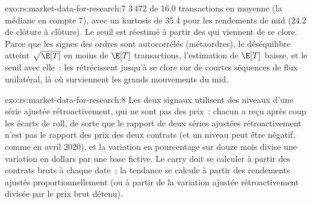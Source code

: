 \begin{solution}{exo:rs:market-data-for-research:7}
3\,472  de 16.0 transactions en moyenne (la  médiane en compte 7), avec un kurtosis de 35.4 pour les rendements de mid (24.2 de clôture à clôture).
Le seuil est réestimé à partir des  qui viennent de se clore. Parce que les signes des ordres sont autocorrélés (métaordres), le déséquilibre
atteint $\sqrt{\E[T]}$ en moins de $\E[T]$ transactions, l'estimation de $\E[T]$ baisse, et le seuil avec elle~: les 
rétrécissent jusqu'à se clore sur de courtes séquences de flux unilatéral, là où surviennent les grands mouvements du mid.
\end{solution}

\begin{solution}{exo:rs:market-data-for-research:8}
Les deux signaux utilisent des niveaux d'une série ajustée rétroactivement, qui ne sont pas des prix~: chacun a reçu après coup les écarts de roll, de sorte que le rapport de deux
séries ajustées rétroactivement n'est pas le rapport des prix des deux contrats (et un niveau peut être négatif, comme en avril 2020), et la
variation en pourcentage sur douze mois divise une variation en dollars par une base fictive. Le carry doit se calculer à partir des contrats bruts à
chaque date~; la tendance se calcule à partir des rendements ajustés proportionnellement (ou à partir de la variation ajustée rétroactivement divisée par le prix brut détenu).
\end{solution}

